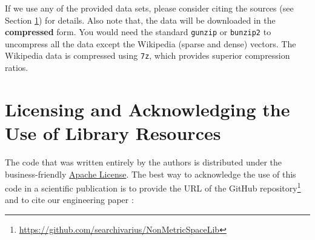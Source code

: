 \documentclass[runningheads,a4paper]{llncs}
\newcommand{\replocfile}{https://github.com/searchivarius/nmslib/blob/v1.5/}
\newcommand{\ttt}[1]{\texttt{#1}}
\begin{document}



If we use any of the provided data sets, please consider citing the sources (see Section \ref{SectionCredits}) for details.
Also note that, the data will be downloaded in the \textbf{compressed} form.
You would need the standard \ttt{gunzip} or \ttt{bunzip2} to uncompress all the data except
the Wikipedia (sparse and dense) vectors.
The Wikipedia data is compressed using \ttt{7z}, which provides 
superior compression ratios.

\section{Licensing and Acknowledging the Use of Library Resources}\label{SectionCredits}
The code that was written entirely by the authors is distributed 
under the business-friendly \href{http://apache.org/licenses/LICENSE-2.0}{Apache License}. 
The best way to acknowledge the use of this code 
in a scientific publication is to 
provide the URL of the GitHub repository\footnote{\url{https://github.com/searchivarius/NonMetricSpaceLib}} 
and to cite our engineering paper \cite{Boytsov_and_Bilegsaikhan:sisap2013}:
\end{document}
